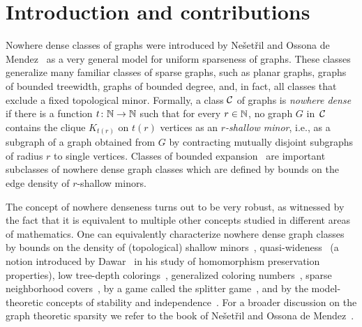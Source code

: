 \section{Introduction and contributions}\label{sec:intro}

Nowhere dense classes of graphs were introduced 
by Ne\v set\v ril and Ossona de 
Mendez~\cite{nevsetvril2010first,nevsetvril2011nowhere} as a very 
general model
for uniform sparseness of graphs. These classes generalize many 
familiar classes of sparse graphs, such as planar graphs, graphs 
of bounded treewidth,  graphs of bounded degree, and, in fact, 
all classes that exclude a fixed 
topological minor.
Formally, a class $\mathcal{C}$ of graphs is {\em{nowhere dense}} if there is a function $t\colon \mathbb{N}\to \mathbb{N}$ such that for every $r\in \mathbb{N}$, no graph $G$ in~$\mathcal{C}$ contains the clique $K_{t(r)}$ on $t(r)$ vertices  as an {\em{$r$-shallow minor}},
i.e., as a subgraph of a graph obtained from $G$ by contracting mutually disjoint  subgraphs of radius $r$   to single vertices.
Classes of bounded expansion~\cite{nevsetvril2008grad} 
are important subclasses 
of nowhere dense graph classes which are defined by bounds on 
the edge density of $r$-shallow minors.


The concept of nowhere denseness
turns out to be very robust, as witnessed by the fact that it is equivalent 
to multiple other concepts studied in different areas of mathematics. 
One can equivalently characterize nowhere dense graph classes 
by bounds on the density of (topological) shallow 
minors~\cite{nevsetvril2010first,nevsetvril2011nowhere},
quasi-wideness~\cite{nevsetvril2011nowhere} (a notion introduced by
Dawar~\cite{dawar2010homomorphism} in his study of homomorphism
preservation properties), low tree-depth
colorings~\cite{nevsetvril2008grad}, generalized coloring
numbers~\cite{zhu2009coloring}, sparse neighborhood
covers~\cite{GroheKRSS15,grohe2014deciding}, by a game called the
splitter game~\cite{grohe2014deciding}, and by the model-theoretic
concepts of stability and independence~\cite{adler2014interpreting}.
For a broader discussion on the graph theoretic sparsity we refer to the book
of Ne\v{s}et\v{r}il and Ossona de Mendez~\cite{sparsity}.

